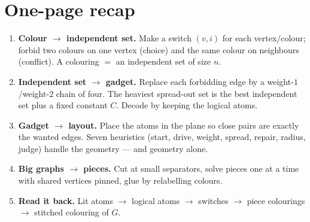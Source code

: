 \documentclass[11pt]{article}
\begin{document}
\section*{One-page recap}

\begin{enumerate}[leftmargin=1.6em,itemsep=2pt]
  \item \textbf{Colour $\to$ independent set.} Make a switch $(v,i)$ for each
        vertex/colour; forbid two colours on one vertex (choice) and the same
        colour on neighbours (conflict). A colouring $=$ an independent set of
        size $n$.
  \item \textbf{Independent set $\to$ gadget.} Replace each forbidding edge by a
        weight-$1$/weight-$2$ chain of four. The heaviest spread-out set is the
        best independent set plus a fixed constant $C$. Decode by keeping the
        logical atoms.
  \item \textbf{Gadget $\to$ layout.} Place the atoms in the plane so close pairs
        are exactly the wanted edges. Seven heuristics (start, drive, weight,
        spread, repair, radius, judge) handle the geometry --- and geometry alone.
  \item \textbf{Big graphs $\to$ pieces.} Cut at small separators, solve pieces one
        at a time with shared vertices pinned, glue by relabelling colours.
  \item \textbf{Read it back.} Lit atoms $\to$ logical atoms $\to$ switches $\to$
        piece colourings $\to$ stitched colouring of $G$.
\end{enumerate}
\end{document}
